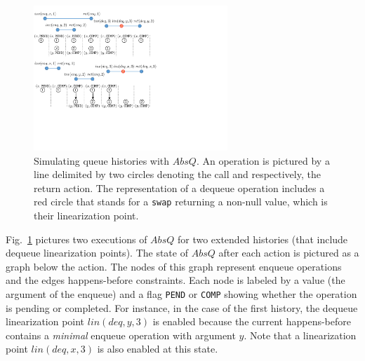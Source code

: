 \begin{figure}
\vspace{-6mm}
\includegraphics[width=7.3cm]{fig-queue12.pdf}
%
\vspace{-8mm}
\caption{Simulating queue histories with $AbsQ$. An operation is pictured by a line delimited by two circles denoting the call and respectively, the return action. The representation of a dequeue operation includes a red circle that stands for a {\tt swap} returning a non-null value, which is their linearization point.}
\label{fig:queueSim}
\vspace{-6mm}
\end{figure}
Fig.~\ref{fig:queueSim} pictures two executions of $AbsQ$ for two extended histories (that include dequeue linearization points). The state of $AbsQ$ after each action is pictured as a graph below the action. The nodes of this graph represent enqueue operations and the edges happens-before constraints. Each node is labeled by a value (the argument of the enqueue) and a flag {\tt PEND} or {\tt COMP} showing whether the operation is pending or completed. For instance, in the case of the first history, the dequeue linearization point $lin(deq,y,3)$ is enabled because the current happens-before contains a \emph{minimal} enqueue operation with argument $y$. Note that a linearization point $lin(deq,x,3)$ is also enabled at this state.

